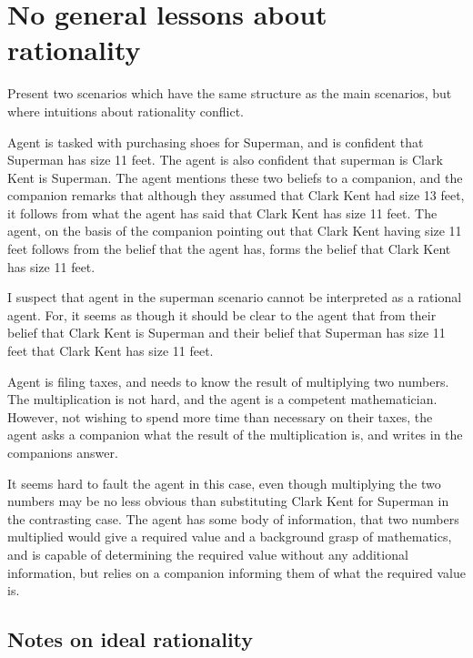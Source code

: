 \documentclass[10pt]{article}
\begin{document}
\section{No general lessons about rationality}
\label{sec:no-general-lessons}

Present two scenarios which have the same structure as the main scenarios, but where intuitions about rationality conflict.

\begin{scenario}[Superman]
  Agent is tasked with purchasing shoes for Superman, and is confident that Superman has size 11 feet.
  The agent is also confident that superman is Clark Kent is Superman.
  The agent mentions these two beliefs to a companion, and the companion remarks that although they assumed that Clark Kent had size 13 feet, it follows from what the agent has said that Clark Kent has size 11 feet.
  The agent, on the basis of the companion pointing out that Clark Kent having size 11 feet follows from the belief that the agent has, forms the belief that Clark Kent has size 11 feet.
\end{scenario}

I suspect that agent in the superman scenario cannot be interpreted as a rational agent.
For, it seems as though it should be clear to the agent that from their belief that Clark Kent is Superman and their belief that Superman has size 11 feet that Clark Kent has size 11 feet.

\begin{scenario}[Calculator]
  Agent is filing taxes, and needs to know the result of multiplying two numbers.
  The multiplication is not hard, and the agent is a competent mathematician.
  However, not wishing to spend more time than necessary on their taxes, the agent asks a companion what the result of the multiplication is, and writes in the companions answer.
\end{scenario}

It seems hard to fault the agent in this case, even though multiplying the two numbers may be no less obvious than substituting Clark Kent for Superman in the contrasting case.
The agent has some body of information, that two numbers multiplied would give a required value and a background grasp of mathematics, and is capable of determining the required value without any additional information, but relies on a companion informing them of what the required value is.

\subsection{Notes on ideal rationality}
\label{sec:notes-ideal-rati}
\end{document}

